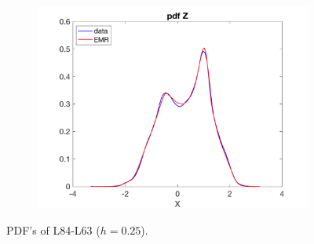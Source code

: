 \documentclass[12pt]{article}
\begin{document}
\begin{figure}[H]
\begin{subfigure}[b]{0.3\textwidth}
		\includegraphics[width=\textwidth]{plots/l84l63/emrpdfzl84025.png}
	\end{subfigure}
	\caption{PDF's of L84-L63 ($h=0.25$).}
\end{figure}
\end{document}
